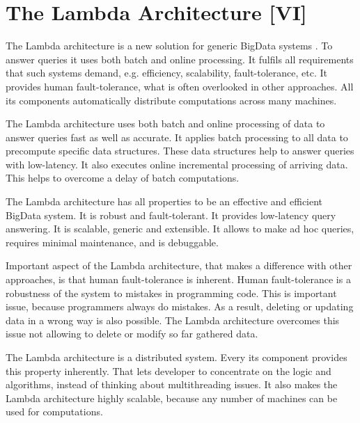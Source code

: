 \chapter{The Lambda Architecture [VI]}
\label{chap:lambda_architecture}


The Lambda architecture is a new solution for generic BigData systems \cite{Marz2014}.
To answer queries it uses both batch and online processing.
It fulfils all requirements that such systems demand, e.g. efficiency, scalability, fault-tolerance, etc.
It provides human fault-tolerance, what is often overlooked in other approaches.
All its components automatically distribute computations across many machines.


The Lambda architecture uses both batch and online processing of data to answer queries fast as well as accurate.
It applies batch processing to all data to precompute specific data structures.
These data structures help to answer queries with low-latency.
It also executes online incremental processing of arriving data.
This helps to overcome a delay of batch computations.

The Lambda architecture has all properties to be an effective and efficient BigData system.
It is robust and fault-tolerant.
It provides low-latency query answering.
It is scalable, generic and extensible.
It allows to make ad hoc queries, requires minimal maintenance, and is debuggable.

Important aspect of the Lambda architecture, that makes a difference with other approaches, is that human fault-tolerance is inherent.
Human fault-tolerance is a robustness of the system to mistakes in programming code.
This is important issue, because programmers always do mistakes.
As a result, deleting or updating data in a wrong way is also possible.
The Lambda architecture overcomes this issue not allowing to delete or modify so far gathered data.

The Lambda architecture is a distributed system.
Every its component provides this property inherently.
That lets developer to concentrate on the logic and algorithms, instead of thinking about multithreading issues.
It also makes the Lambda architecture highly scalable, because any number of machines can be used for computations.







